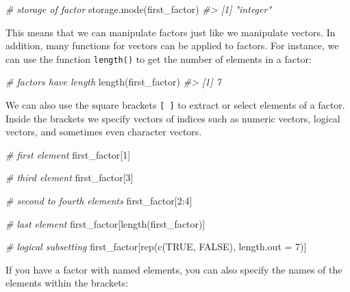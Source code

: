 \documentclass[
]{book}
\newenvironment{Shaded}{\begin{snugshade}}{\end{snugshade}}
\newcommand{\AttributeTok}[1]{\textcolor[rgb]{0.77,0.63,0.00}{#1}}
\newcommand{\CommentTok}[1]{\textcolor[rgb]{0.56,0.35,0.01}{\textit{#1}}}
\newcommand{\ConstantTok}[1]{\textcolor[rgb]{0.00,0.00,0.00}{#1}}
\newcommand{\DecValTok}[1]{\textcolor[rgb]{0.00,0.00,0.81}{#1}}
\newcommand{\FunctionTok}[1]{\textcolor[rgb]{0.00,0.00,0.00}{#1}}
\newcommand{\NormalTok}[1]{#1}
\newcommand{\SpecialCharTok}[1]{\textcolor[rgb]{0.00,0.00,0.00}{#1}}
\begin{document}
\begin{Shaded}
\begin{Highlighting}[]
\CommentTok{\# storage of factor}
\FunctionTok{storage.mode}\NormalTok{(first\_factor)}
\CommentTok{\#\textgreater{} [1] "integer"}
\end{Highlighting}
\end{Shaded}

This means that we can manipulate factors just like we manipulate vectors. In
addition, many functions for vectors can be applied to factors. For instance,
we can use the function \texttt{length()} to get the number of elements in a factor:

\begin{Shaded}
\begin{Highlighting}[]
\CommentTok{\# factors have length}
\FunctionTok{length}\NormalTok{(first\_factor)}
\CommentTok{\#\textgreater{} [1] 7}
\end{Highlighting}
\end{Shaded}

We can also use the square brackets \texttt{{[}\ {]}} to extract or select elements of a
factor. Inside the brackets we specify vectors of indices such as numeric
vectors, logical vectors, and sometimes even character vectors.

\begin{Shaded}
\begin{Highlighting}[]
\CommentTok{\# first element}
\NormalTok{first\_factor[}\DecValTok{1}\NormalTok{]}

\CommentTok{\# third element}
\NormalTok{first\_factor[}\DecValTok{3}\NormalTok{]}

\CommentTok{\# second to fourth elements}
\NormalTok{first\_factor[}\DecValTok{2}\SpecialCharTok{:}\DecValTok{4}\NormalTok{]}

\CommentTok{\# last element}
\NormalTok{first\_factor[}\FunctionTok{length}\NormalTok{(first\_factor)]}

\CommentTok{\# logical subsetting}
\NormalTok{first\_factor[}\FunctionTok{rep}\NormalTok{(}\FunctionTok{c}\NormalTok{(}\ConstantTok{TRUE}\NormalTok{, }\ConstantTok{FALSE}\NormalTok{), }\AttributeTok{length.out =} \DecValTok{7}\NormalTok{)]}
\end{Highlighting}
\end{Shaded}

If you have a factor with named elements, you can also specify the names of
the elements within the brackets:
\end{document}

